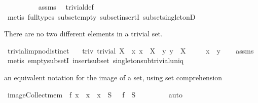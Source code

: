 \begin{isabellebody}
%
\isadelimproof
\isanewline
\ \ \ \ \ \ \ \ %
\endisadelimproof
%
\isatagproof
{}\isamarkupfalse%
\ assms\ \isamarkupfalse%
\ trivial{\isacharunderscore}def\ \isanewline
\ \ \ \ \ \ \ \ \isamarkupfalse%
\ {\isacharparenleft}metis\ {\isacharparenleft}full{\isacharunderscore}types{\isacharparenright}\ subset{\isacharunderscore}empty\ subset{\isacharunderscore}insertI{}\ subset{\isacharunderscore}singletonD{\isacharparenright}%
\endisatagproof
{\isafoldproof}%
%
\isadelimproof
%
\endisadelimproof
%
\begin{isamarkuptext}%
There are no two different elements in a trivial set.%
\end{isamarkuptext}%
\isamarkuptrue%
\isamarkupfalse%
\ trivial{\isacharunderscore}imp{\isacharunderscore}no{\isacharunderscore}distinct{\isacharcolon}\isanewline
\ \ \ triv{\isacharcolon}\ {\isachardoublequoteopen}trivial\ X{\isachardoublequoteclose}\ \ x{\isacharcolon}\ {\isachardoublequoteopen}x\ {\isasymin}\ X{\isachardoublequoteclose}\ \ y{\isacharcolon}\ {\isachardoublequoteopen}y\ {\isasymin}\ X{\isachardoublequoteclose}\isanewline
\ \ \ \ \ {\isachardoublequoteopen}x\ {\isacharequal}\ y{\isachardoublequoteclose}\isanewline
%
\isadelimproof
\isanewline
\ \ %
\endisadelimproof
%
\isatagproof
{}\isamarkupfalse%
\ assms\ \isamarkupfalse%
\ {\isacharparenleft}metis\ empty{\isacharunderscore}subsetI\ insert{\isacharunderscore}subset\ singleton{\isacharunderscore}sub{\isacharunderscore}trivial{\isacharunderscore}uniq{\isacharparenright}%
\endisatagproof
{\isafoldproof}%
%
\isadelimproof
%
\endisadelimproof
%
\isamarkuptrue%
%
\begin{isamarkuptext}%
an equivalent notation for the image of a set, using set comprehension%
\end{isamarkuptext}%
\isamarkuptrue%
\isamarkupfalse%
\ image{\isacharunderscore}Collect{\isacharunderscore}mem{\isacharcolon}\ {\isachardoublequoteopen}{\isacharbraceleft}\ f\ x\ {\isacharbar}\ x\ {\isachardot}\ x\ {\isasymin}\ S\ {\isacharbraceright}\ {\isacharequal}\ f\ {\isacharbackquote}\ S{\isachardoublequoteclose}\ \isanewline
%
\isadelimproof
\ \ \ \ \ \ %
\endisadelimproof
%
\isatagproof
{}\isamarkupfalse%
\ auto%
\endisatagproof
{\isafoldproof}%
%
\isadelimproof
%
\endisadelimproof
%
\isamarkuptrue%
%
\begin{isamarkuptext}%

\end{isamarkuptext}
\end{isabellebody}
